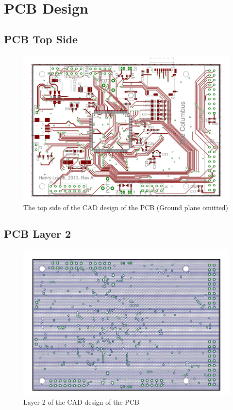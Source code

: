 \chapter{PCB Design} \label{Appendix:PCB}
\section{PCB Top Side}
\begin{figure}[ht!]
\centering
\includegraphics[angle=90,width=\textwidth,height=\textheight-5cm,keepaspectratio]{Figures/PCB_Top.pdf} 
\caption{The top side of the CAD design of the PCB (Ground plane omitted)}
\label{fig:PCB:Eagle:Top}
\end{figure}
\clearpage
\section{PCB Layer 2}
\begin{figure}[ht!]
\centering
\includegraphics[angle=90,width=\textwidth,height=\textheight-5cm,keepaspectratio]{Figures/PCB_3v3.pdf} 
\caption{Layer 2 of the CAD design of the PCB}
\label{fig:PCB:Eagle:Bottom}
\end{figure}
\clearpage
